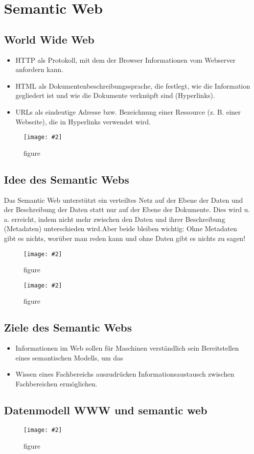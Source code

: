 \documentclass[a4paper,10pt,titlepage=false]{scrreprt}
\newcommand{\pic}[2][figure]{\begin{figure}[h]
 \centering
 \texttt{[image: \#2]}
 \caption{#1}
\end{figure}
}
\begin{document}
\chapter{Semantic Web} %
\label{cha:semantic_web}
\section{World Wide Web} %
\label{sec:world_wide_web}
\begin{itemize}
  \item HTTP als Protokoll, mit dem der Browser
Informationen vom Webserver anfordern kann.
\item HTML als Dokumentenbeschreibungssprache, die
festlegt, wie die Information gegliedert ist und wie die
Dokumente verknüpft sind (Hyperlinks).
\item URLs als eindeutige Adresse bzw. Bezeichnung einer
Ressource (z. B. einer Webseite), die in Hyperlinks
verwendet wird.
\end{itemize}
\pic{sweb.png}

\section{Idee des Semantic Webs} %
\label{sec:idee_des_semantic_webs}
Das Semantic Web unterstützt ein verteiltes Netz auf der
Ebene der Daten und der Beschreibung der Daten statt nur
auf der Ebene der Dokumente.
Dies wird u. a. erreicht, indem nicht mehr zwischen den
Daten und ihrer Beschreibung (Metadaten) unterschieden
wird.Aber beide bleiben wichtig:
Ohne Metadaten gibt es nichts,
worüber man reden kann und
ohne Daten gibt es nichts zu sagen!

\pic{sweb2.png}
\pic{sweb3.png}

\section{Ziele des Semantic Webs} %
\label{sec:ziele_des_semantic_webs}
\begin{itemize}
  \item Informationen im Web sollen für Maschinen
verständlich sein
Bereitstellen eines semantischen Modells, um das
\item Wissen eines Fachbereichs auszudrücken
Informationsaustausch zwischen Fachbereichen
ermöglichen.
\end{itemize}
\section{Datenmodell WWW und semantic web} %
\label{sec:datenmodell_www}
\pic{dmweb.png}
\end{document}
